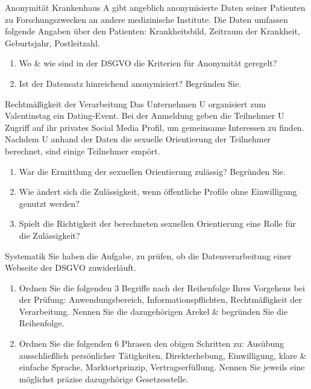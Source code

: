 \documentclass{exercisesheet}
\begin{document}
\begin{exercise*}{Anonymität}
  Krankenhaus A gibt angeblich anonymisierte Daten seiner Patienten zu Forschungszwecken an andere medizinische Institute. Die Daten umfassen folgende Angaben über den Patienten: Krankheitsbild, Zeitraum der Krankheit, Geburtsjahr, Postleitzahl.
  \begin{enumerate}
    \item Wo \& wie sind in der DSGVO die Kriterien für Anonymität geregelt?
    \item Ist der Datensatz hinreichend anonymisiert? Begründen Sie.
  \end{enumerate}
\end{exercise*}

\begin{exercise*}{Rechtmäßigkeit der Verarbeitung}
  Das Unternehmen U organisiert zum Valentinstag ein Dating-Event. Bei der Anmeldung geben die Teilnehmer U Zugriff auf ihr privates Social Media Profil, um gemeinsame Interessen zu finden. Nachdem U anhand der Daten die sexuelle Orientierung der Teilnehmer berechnet, sind einige Teilnehmer empört.
  \begin{enumerate}
    \item War die Ermittlung der sexuellen Orientierung zulässig? Begründen Sie.
    \item Wie ändert sich die Zulässigkeit, wenn öffentliche Profile ohne Einwilligung genutzt werden?
    \item Spielt die Richtigkeit der berechneten sexuellen Orientierung eine Rolle für die Zulässigkeit?
  \end{enumerate}
\end{exercise*}

\begin{exercise*}{Systematik}
  Sie haben die Aufgabe, zu prüfen, ob die Datenverarbeitung einer Webseite der DSGVO zuwiderläuft.
  \begin{enumerate}
    \item Ordnen Sie die folgenden 3 Begriffe nach der Reihenfolge Ihres Vorgehens bei der Prüfung: Anwendungsbereich, Informationspflichten, Rechtmäßigkeit der Verarbeitung. Nennen Sie die dazugehörigen Arekel \& begründen Sie die Reihenfolge.
    \item Ordnen Sie die folgenden 6 Phrasen den obigen Schritten zu: Ausübung ausschließlich persönlicher Tätigkeiten, Direkterhebung, Einwilligung, klare \& einfache Sprache, Marktortprinzip, Vertragserfüllung. Nennen Sie jeweils eine möglichst präzise dazugehörige Gesetzesstelle.
  \end{enumerate}
\end{exercise*}
\end{document}
